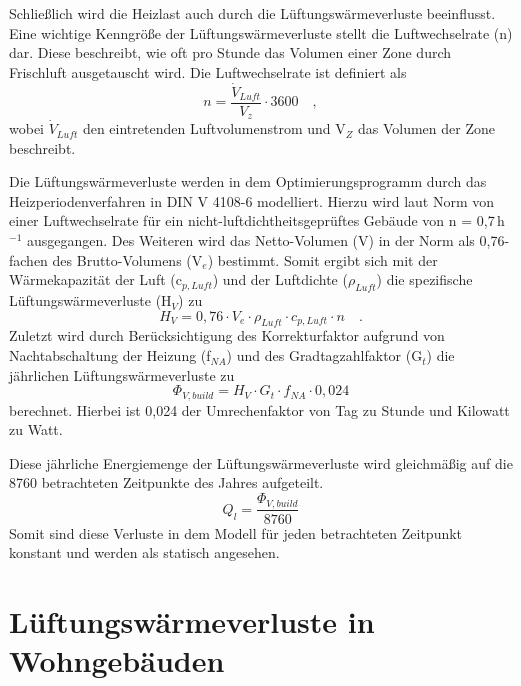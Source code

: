 Schließlich wird die Heizlast auch durch die Lüftungswärmeverluste beeinflusst.
Eine wichtige Kenngröße der Lüftungswärmeverluste stellt die Luftwechselrate (n) dar.
Diese beschreibt, wie oft pro Stunde das Volumen einer Zone durch Frischluft ausgetauscht wird.
Die Luftwechselrate ist definiert als
\begin{equation}
\label{eq:Gleichun330}
n = \frac{\Dot{V}_{Luft}}{V_z} \cdot 3600 \quad,
\end{equation}
wobei \(\Dot{V}_{Luft}\) den eintretenden Luftvolumenstrom und V\(_Z\) das Volumen der Zone beschreibt.

Die Lüftungswärmeverluste werden in dem Optimierungsprogramm durch das Heizperiodenverfahren in DIN V 4108-6 \cite{DeutschesInstitutfurNormunge.V..Juni2003} modelliert.
Hierzu wird laut Norm von einer Luftwechselrate für ein nicht-luftdichtheitsgeprüftes Gebäude von n = 0,7\,h\(^{-1}\) ausgegangen. 
Des Weiteren wird das Netto-Volumen (V) in der Norm als 0,76-fachen des Brutto-Volumens (V\(_e\)) bestimmt.
Somit ergibt sich mit der Wärmekapazität der Luft (c\(_{p, Luft}\)) und der Luftdichte (\(\rho_{Luft}\)) die spezifische Lüftungswärmeverluste (H\(_V\)) zu
\begin{equation}
\label{eq:Gleichung328}
H_V = 0,76 \cdot V_e \cdot \rho_{Luft} \cdot c_{p, Luft} \cdot n \quad \text{.}
\end{equation}
Zuletzt wird durch Berücksichtigung des Korrekturfaktor aufgrund von Nachtabschaltung der Heizung (f\(_{NA}\)) und des Gradtagzahlfaktor (G\(_t\)) die jährlichen Lüftungswärmeverluste zu
\begin{equation}
\label{eq:Gleichung329}
\Phi_{V, build} = H_V \cdot G_t \cdot f_{NA} \cdot 0,024
\end{equation}
berechnet.
Hierbei ist 0,024 der Umrechenfaktor von Tag zu Stunde und Kilowatt zu Watt.

Diese jährliche Energiemenge der Lüftungswärmeverluste wird gleichmäßig auf die 8760 betrachteten Zeitpunkte des Jahres aufgeteilt.
\begin{equation}
\label{eq:Gleichung3291}
Q_l = \frac{\Phi_{V,build}}{8760}
\end{equation}
Somit sind diese Verluste in dem Modell für jeden betrachteten Zeitpunkt konstant und werden als statisch angesehen.

\newpage

\section{Lüftungswärmeverluste in Wohngebäuden}
\label{sec:Sektion 33}

